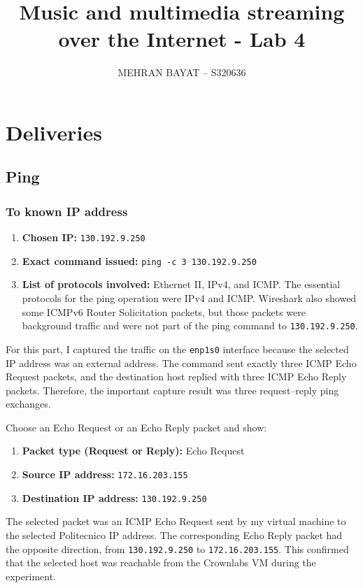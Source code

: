 \documentclass{article}
\title{Music and multimedia streaming over the Internet - Lab 4}
\author{MEHRAN BAYAT -- S320636}
\begin{document}
\maketitle
\newpage
\section{Deliveries}

\subsection{Ping}

\subsubsection{To known IP address} \label{sec:ip-ping}

\begin{enumerate}
    \item \textbf{Chosen IP:} \texttt{130.192.9.250}
    \item \textbf{Exact command issued:} \texttt{ping -c 3 130.192.9.250}
    \item \textbf{List of protocols involved:} Ethernet II, IPv4, and ICMP. The essential protocols for the ping operation were IPv4 and ICMP. Wireshark also showed some ICMPv6 Router Solicitation packets, but those packets were background traffic and were not part of the ping command to \texttt{130.192.9.250}.
\end{enumerate}

For this part, I captured the traffic on the \texttt{enp1s0} interface because the selected IP address was an external address. The command sent exactly three ICMP Echo Request packets, and the destination host replied with three ICMP Echo Reply packets. Therefore, the important capture result was three request--reply ping exchanges.

Choose an Echo Request or an Echo Reply packet and show:
\begin{enumerate}
    \item \textbf{Packet type (Request or Reply):} Echo Request
    \item \textbf{Source IP address:} \texttt{172.16.203.155}
    \item \textbf{Destination IP address:} \texttt{130.192.9.250}
\end{enumerate}

The selected packet was an ICMP Echo Request sent by my virtual machine to the selected Politecnico IP address. The corresponding Echo Reply packet had the opposite direction, from \texttt{130.192.9.250} to \texttt{172.16.203.155}. This confirmed that the selected host was reachable from the Crownlabs VM during the experiment.
\end{document}

